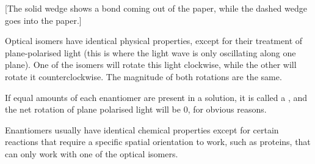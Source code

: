 			[The solid wedge shows a bond coming out of the paper, while the dashed wedge goes into the paper.]


			Optical isomers have identical physical properties, except for their treatment of plane-polarised light (this is
			where the light wave is only oscillating along one plane). One of the isomers will rotate this light clockwise, while the
			other will rotate it counterclockwise. The magnitude of both rotations are the same.

			If equal amounts of each enantiomer are present in a solution, it is called a , and the net
			rotation of plane polarised light will be 0, for obvious reasons.

			Enantiomers usually have identical chemical properties except for certain reactions that require a specific spatial
			orientation to work, such as proteins, that can only work with one of the optical isomers.

















